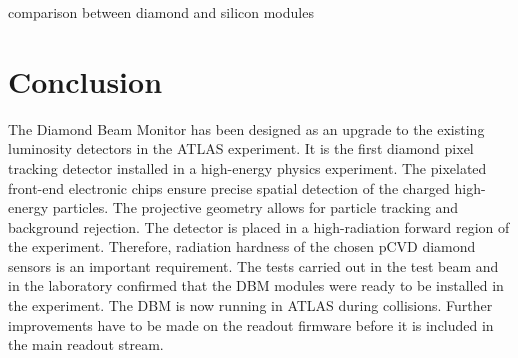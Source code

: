 \documentclass[12pt]{packages/mytustyle}  %
\begin{document}
comparison between diamond and silicon modules

\section{Conclusion}
\label{sec:limitations}
The Diamond Beam Monitor has been designed as an upgrade to the existing luminosity detectors in the ATLAS experiment. It is the first diamond pixel tracking detector installed in a high-energy physics experiment. The pixelated front-end electronic chips ensure precise spatial detection of the charged high-energy particles. The projective geometry allows for particle tracking and background rejection. The detector is placed in a high-radiation forward region of the experiment. Therefore, radiation hardness of the chosen pCVD diamond sensors is an important requirement. The tests carried out in the test beam and in the laboratory confirmed that the DBM modules were ready to be installed in the experiment. The DBM is now running in ATLAS during collisions. Further improvements have to be made on the readout firmware before it is included in the main readout stream. 





\end{document}
